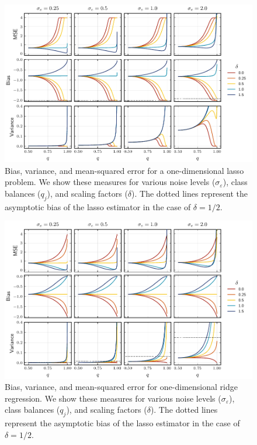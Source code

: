 \begin{figure}[htpb]
  \centering
  \includegraphics[]{plots/binary_onedim_bias_var_lasso.pdf}
  \caption{%
    Bias, variance, and mean-squared error for a one-dimensional lasso problem. We show these measures for various noise levels (\(\sigma_\varepsilon\)), class balances (\(q_j\)), and scaling factors (\(\delta\)).
    The dotted lines represent the asymptotic bias of the lasso estimator in the case of \(\delta = 1/2\).
  }
  \label{fig:bias-var-onedim-lasso}
\end{figure}

\begin{figure}[htpb]
  \centering
  \includegraphics[]{plots/binary_onedim_bias_var_ridge.pdf}
  \caption{%
    Bias, variance, and mean-squared error for one-dimensional ridge regression. We show these measures for various noise levels (\(\sigma_\varepsilon\)), class balances (\(q_j\)), and scaling factors (\(\delta\)).
    The dotted lines represent the asymptotic bias of the lasso estimator in the case of \(\delta = 1/2\).
  }
  \label{fig:bias-var-onedim-ridge}
\end{figure}

